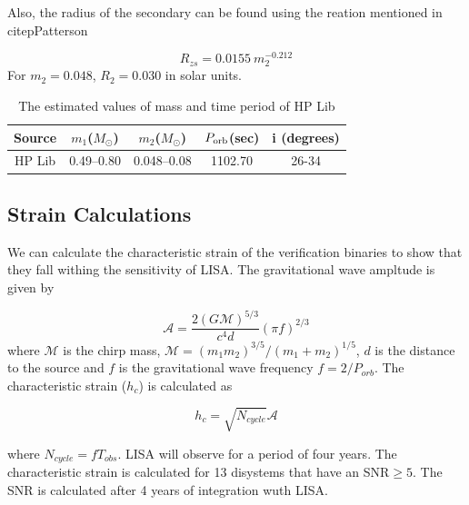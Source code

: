 \documentclass[12pt,a4paper,oneside]{book}
\begin{document}
Also, the radius of the secondary can be found using the reation mentioned in citep{Patterson}

\begin{equation}
R_{zs} = 0.0155 \ m_2^{-0.212}
\end{equation}
For $m_2 = 0.048$, $R_2 = 0.030$ in solar units.

\begin{table}[!htb]
\centering
\begin{tabular}{|c|c|c|c|c|}
\hline 
\rule[-1ex]{0pt}{2.5ex} Source & $m_1$($M_{\odot}$) & $m_2$($M_{\odot}$) & $P_{\rm orb}$(sec) &i (degrees) \\ 
\hline 
\rule[-1ex]{0pt}{2.5ex} HP Lib & 0.49--0.80 & 0.048--0.08 & 1102.70 & 26-34\\ 
\hline 
\end{tabular}
\caption{The estimated values of mass and time period of HP Lib}
\label{table1}
\end{table}


\subsection*{Strain Calculations}

We can calculate the characteristic strain of the verification binaries to show that they fall withing the sensitivity of LISA. The gravitational wave ampltude is given by


\begin{equation}
\label{eq:Amplitude}
\mathcal{A} = \frac{2 (G \mathcal{M})^{5/3}}{c^4 d} (\pi f)^{2/3}
\end{equation}
where $\mathcal{M}$ is the chirp mass, $\mathcal{M} = (m_1 m_2)^{3/5}/(m_1 + m_2)^{1/5}$, $d$ is the distance to the source and $f$ is the gravitational wave frequency $f = 2/P_{orb}$. The characteristic strain ($h_c$) is calculated as 

\begin{equation}
\label{eq:hc}
h_{c} = \sqrt{N_{cycle}} \mathcal{A}
\end{equation}

where $N_{cycle} = fT_{obs}$. LISA will observe for a period of four years. The characteristic strain is calculated for 13 disystems that have an SNR$\geq 5$. The SNR is calculated after 4 years of integration wuth LISA.
\end{document}
